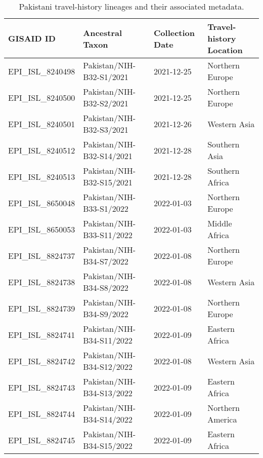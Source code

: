 \clearpage

\begin{table}[!htbp]
\footnotesize
\begin{tabular}{@{\extracolsep\fill}llll@{\extracolsep\fill}}
\toprule
GISAID ID & Ancestral Taxon & Collection Date & Travel-history Location\\
\midrule
EPI\_ISL\_8240498 & Pakistan/NIH-B32-S1/2021    &   2021-12-25    & Northern Europe\\
EPI\_ISL\_8240500 & Pakistan/NIH-B32-S2/2021    &   2021-12-25    & Northern Europe\\
EPI\_ISL\_8240501 & Pakistan/NIH-B32-S3/2021    &   2021-12-26    & Western Asia\\
EPI\_ISL\_8240512 & Pakistan/NIH-B32-S14/2021    &  2021-12-28    & Southern Asia\\
EPI\_ISL\_8240513 & Pakistan/NIH-B32-S15/2021    &  2021-12-28    & Southern Africa\\
EPI\_ISL\_8650048 & Pakistan/NIH-B33-S1/2022    &   2022-01-03    & Northern Europe\\
EPI\_ISL\_8650053 & Pakistan/NIH-B33-S11/2022    &  2022-01-03    & Middle Africa\\
EPI\_ISL\_8824737 & Pakistan/NIH-B34-S7/2022    &   2022-01-08    & Northern Europe\\
EPI\_ISL\_8824738 & Pakistan/NIH-B34-S8/2022    &   2022-01-08    & Western Asia\\
EPI\_ISL\_8824739 & Pakistan/NIH-B34-S9/2022    &   2022-01-08    & Northern Europe\\
EPI\_ISL\_8824741 & Pakistan/NIH-B34-S11/2022    &  2022-01-09    & Eastern Africa\\
EPI\_ISL\_8824742 & Pakistan/NIH-B34-S12/2022    &  2022-01-08    & Western Asia\\
EPI\_ISL\_8824743 & Pakistan/NIH-B34-S13/2022    &  2022-01-09    & Eastern Africa\\
EPI\_ISL\_8824744 & Pakistan/NIH-B34-S14/2022    &  2022-01-09    & Northern America\\
EPI\_ISL\_8824745 & Pakistan/NIH-B34-S15/2022    &  2022-01-09    & Eastern Africa\\
\bottomrule
\end{tabular}
\caption{Pakistani travel-history lineages and their associated metadata.}%
\label{tab:travel_histories}
\end{table}

